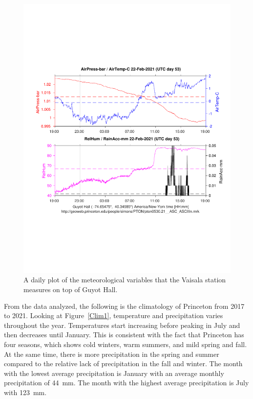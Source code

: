 \documentclass[11pt]{report}
\begin{document}
\begin{figure}[thb]
\centering \includegraphics[trim = 0.5cm 5.0cm 0.5cm 6.0cm,clip,width=1.0\textwidth]
{Figures/guyotweather_ywt_feb_22_2021.pdf}
\caption[Weather Station Data]{\label{daily}A daily plot of the
  meteorological variables that the Vaisala station measures on top
  of Guyot Hall.}
\end{figure}


From the data analyzed, the following is the climatology of Princeton from
2017 to 2021. Looking at Figure~\ref{Clim1}, temperature
and precipitation varies throughout the year. Temperatures start
increasing before peaking in July and then decreases until January. This is
consistent with the fact that Princeton has four seasons, which shows cold
winters, warm summers, and mild spring and fall. At the same time, there is
more precipitation in the spring and summer compared to the relative lack of
precipitation in the fall and winter. The month with the lowest average 
precipitation is January with an average monthly precipitation of 44~mm. 
The month with the highest average precipitation is July with 123~mm.
\end{document}

